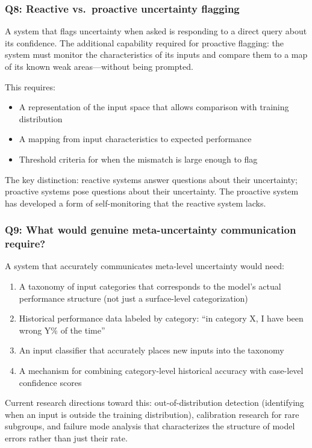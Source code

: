 \subsubsection*{Q8: Reactive vs.\ proactive uncertainty flagging}

A system that flags uncertainty when asked is responding to a direct query about its confidence. The additional capability required for proactive flagging: the system must monitor the characteristics of its inputs and compare them to a map of its known weak areas---without being prompted.

This requires:
\begin{itemize}
    \item A representation of the input space that allows comparison with training distribution
    \item A mapping from input characteristics to expected performance
    \item Threshold criteria for when the mismatch is large enough to flag
\end{itemize}

The key distinction: reactive systems answer questions about their uncertainty; proactive systems pose questions about their uncertainty. The proactive system has developed a form of self-monitoring that the reactive system lacks.

\subsubsection*{Q9: What would genuine meta-uncertainty communication require?}

A system that accurately communicates meta-level uncertainty would need:
\begin{enumerate}
    \item A taxonomy of input categories that corresponds to the model's actual performance structure (not just a surface-level categorization)
    \item Historical performance data labeled by category: ``in category X, I have been wrong Y\% of the time''
    \item An input classifier that accurately places new inputs into the taxonomy
    \item A mechanism for combining category-level historical accuracy with case-level confidence scores
\end{enumerate}

Current research directions toward this: out-of-distribution detection (identifying when an input is outside the training distribution), calibration research for rare subgroups, and failure mode analysis that characterizes the structure of model errors rather than just their rate.


